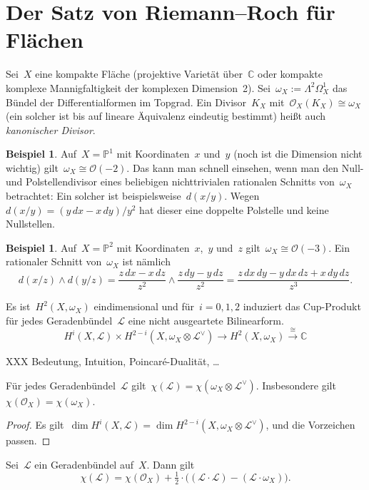 \documentclass[a4paper,ngerman,12pt]{scrartcl}
\theoremstyle{definition}
\newtheorem{ex}[defn]{Beispiel}
\theoremstyle{plain}
\theoremstyle{remark}
\newcommand{\CC}{\mathbb{C}}
\newcommand{\PP}{\mathbb{P}}
\renewcommand{\L}{\mathcal{L}}
\renewcommand{\O}{\mathcal{O}}
\newcommand{\lra}{\longrightarrow}
\begin{document}
\section{Der Satz von Riemann--Roch für Flächen}

Sei~$X$ eine kompakte Fläche (projektive Varietät über~$\CC$ oder kompakte
komplexe Mannigfaltigkeit der komplexen Dimension~2). Sei~$\omega_X :=
\Lambda^2 \Omega^1_X$ das Bündel der Differentialformen im Topgrad. Ein
Divisor~$K_X$ mit~$\O_X(K_X) \cong \omega_X$ (ein solcher ist bis auf lineare
Äquivalenz eindeutig bestimmt) heißt auch \emph{kanonischer Divisor}.

\begin{ex}Auf~$X = \PP^1$ mit Koordinaten~$x$ und~$y$ (noch ist die Dimension
nicht wichtig) gilt~$\omega_X \cong \O(-2)$. Das kann man schnell einsehen,
wenn man den Null- und Polstellendivisor eines beliebigen nichttrivialen
rationalen Schnitts von~$\omega_X$ betrachtet: Ein solcher ist
beispielsweise~$d(x/y)$. Wegen~$d(x/y) = (y\,dx-x\,dy)/y^2$ hat dieser eine
doppelte Polstelle und keine Nullstellen.\end{ex}

\begin{ex}Auf~$X = \PP^2$ mit Koordinaten~$x$,~$y$ und~$z$ gilt~$\omega_X \cong
\O(-3)$. Ein rationaler Schnitt von~$\omega_X$ ist nämlich
\[ d(x/z) \wedge d(y/z) =
  \frac{z\,dx - x\,dz}{z^2} \wedge \frac{z\,dy - y\,dz}{z^2} =
  \frac{z\,dx\,dy - y\,dx\,dz + x\,dy\,dz}{z^3}. \]\end{ex}

\begin{fact}Es ist~$H^2(X,\omega_X)$ eindimensional und
für~$i = 0,1,2$ induziert das Cup-Produkt für jedes Geradenbündel~$\L$ eine
nicht ausgeartete Bilinearform.
\[ H^i(X,\L) \times H^{2-i}(X,\omega_X \otimes \L^\vee) \lra
  H^2(X,\omega_X) \stackrel{\cong}{\lra} \CC \]
\end{fact}

XXX Bedeutung, Intuition, Poincaré-Dualität, \ldots

\begin{cor}Für jedes Geradenbündel~$\L$ gilt~$\chi(\L) = \chi(\omega_X \otimes
\L^\vee)$. Insbesondere gilt~$\chi(\O_X) = \chi(\omega_X)$.\end{cor}
\begin{proof}Es gilt~$\dim H^i(X,\L) = \dim H^{2-i}(X,\omega_X \otimes \L^\vee)$,
und die Vorzeichen passen.
\end{proof}

\begin{thm}
Sei~$\L$ ein Geradenbündel auf~$X$. Dann gilt
\[ \chi(\L) = \chi(\O_X) + \tfrac{1}{2} \cdot \bigl((\L \cdot \L) - (\L \cdot \omega_X)\bigr). \]
\end{thm}
\end{document}
